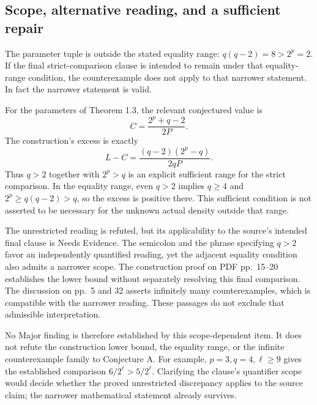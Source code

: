 \documentclass[10pt]{article}
\begin{document}
\subsection*{Scope, alternative reading, and a sufficient repair}
The parameter tuple is outside the stated equality range: \(q(q-2)=8>2^p=2\). If the final strict-comparison clause is intended to remain under that equality-range condition, the counterexample does not apply to that narrower statement. In fact the narrower statement is valid.\par
For the parameters of Theorem 1.3, the relevant conjectured value is \[C=\frac{2^p+q-2}{2P}.\] The construction’s excess is exactly \[L-C=\frac{(q-2)(2^p-q)}{2qP}.\] Thus \(q>2\) together with \(2^p>q\) is an explicit sufficient range for the strict comparison. In the equality range, even \(q>2\) implies \(q\geq4\) and \(2^p\geq q(q-2)>q\), so the excess is positive there. This sufficient condition is not asserted to be necessary for the unknown actual density outside that range.\par
The unrestricted reading is refuted, but its applicability to the source’s intended final clause is Needs Evidence. The semicolon and the phrase specifying \(q>2\) favor an independently quantified reading, yet the adjacent equality condition also admits a narrower scope. The construction proof on PDF pp. 15–20 establishes the lower bound without separately resolving this final comparison. The discussion on pp. 5 and 32 asserts infinitely many counterexamples, which is compatible with the narrower reading. These passages do not exclude that admissible interpretation.\par
No Major finding is therefore established by this scope-dependent item. It does not refute the construction lower bound, the equality range, or the infinite counterexample family to Conjecture A. For example, \(p=3,q=4,\ell\geq9\) gives the established comparison \(6/2^\ell>5/2^\ell\). Clarifying the clause’s quantifier scope would decide whether the proved unrestricted discrepancy applies to the source claim; the narrower mathematical statement already survives.\par
\end{document}

